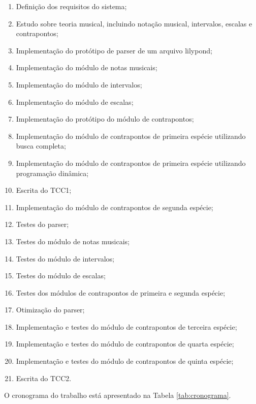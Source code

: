   \begin{enumerate}
    \item \label{t1} Definição dos requisitos do sistema;
    \item \label{t2} Estudo sobre teoria musical, incluindo notação musical, intervalos, escalas e contrapontos;
    \item \label{t3} Implementação do protótipo de parser de um arquivo lilypond;
    \item \label{t4} Implementação do módulo de notas musicais;
    \item \label{t5} Implementação do módulo de intervalos;
    \item \label{t6} Implementação do módulo de escalas;
    \item \label{t7} Implementação do protótipo do módulo de contrapontos;
    \item \label{t8} Implementação do módulo de contrapontos de primeira espécie utilizando busca completa;
    \item \label{t9} Implementação do módulo de contrapontos de primeira espécie utilizando programação dinâmica;
    \item \label{t10} Escrita do TCC1;
    \item \label{t11} Implementação do módulo de contrapontos de segunda espécie;
    \item \label{t12} Testes do parser;
    \item \label{t13} Testes do módulo de notas musicais;
    \item \label{t14} Testes do módulo de intervalos;
    \item \label{t15} Testes do módulo de escalas;
    \item \label{t16} Testes dos módulos de contrapontos de primeira e segunda espécie;
    \item \label{t17} Otimização do parser;
    \item \label{t18} Implementação e testes do módulo de contrapontos de terceira espécie;
    \item \label{t19} Implementação e testes do módulo de contrapontos de quarta espécie;
    \item \label{t20} Implementação e testes do módulo de contrapontos de quinta espécie;
    \item \label{t21} Escrita do TCC2.
  \end{enumerate}

  O cronograma do trabalho está apresentado na Tabela \ref{tab:cronograma}.

